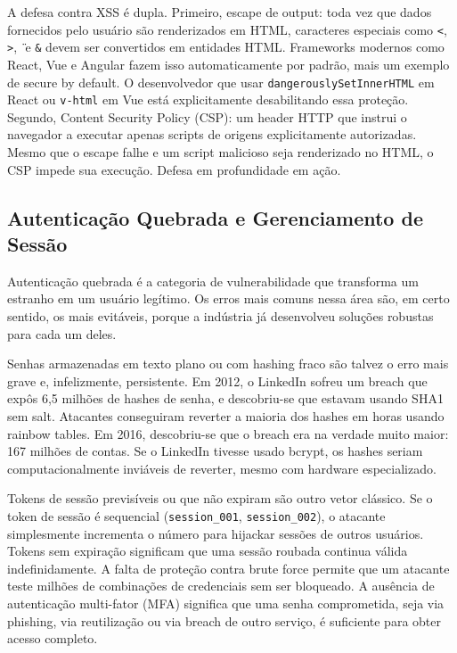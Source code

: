 A defesa contra XSS é dupla. Primeiro, escape de output: toda vez que dados
fornecidos pelo usuário são renderizados em HTML, caracteres especiais como
\texttt{<}, \texttt{>}, \texttt{\"} e \texttt{\&} devem ser convertidos em
entidades HTML. Frameworks modernos como React, Vue e Angular fazem isso
automaticamente por padrão, mais um exemplo de secure by default. O
desenvolvedor que usar \texttt{dangerouslySetInnerHTML} em React ou
\texttt{v-html} em Vue está explicitamente desabilitando essa proteção.
Segundo, Content Security Policy (CSP): um header HTTP que instrui o navegador a
executar apenas scripts de origens explicitamente autorizadas. Mesmo que o escape
falhe e um script malicioso seja renderizado no HTML, o CSP impede sua execução.
Defesa em profundidade em ação.

\subsection{Autenticação Quebrada e Gerenciamento de Sessão}

Autenticação quebrada é a categoria de vulnerabilidade que transforma um
estranho em um usuário legítimo. Os erros mais comuns nessa área são, em certo
sentido, os mais evitáveis, porque a indústria já desenvolveu soluções robustas
para cada um deles.

Senhas armazenadas em texto plano ou com hashing fraco são talvez o erro mais
grave e, infelizmente, persistente. Em 2012, o LinkedIn sofreu um breach que
expôs 6,5 milhões de hashes de senha, e descobriu-se que estavam usando SHA1
sem salt. Atacantes conseguiram reverter a maioria dos hashes em horas usando
rainbow tables. Em 2016, descobriu-se que o breach era na verdade muito maior:
167 milhões de contas. Se o LinkedIn tivesse usado bcrypt, os hashes seriam
computacionalmente inviáveis de reverter, mesmo com hardware especializado.

Tokens de sessão previsíveis ou que não expiram são outro vetor clássico. Se o
token de sessão é sequencial (\texttt{session\_001}, \texttt{session\_002}),
o atacante simplesmente incrementa o número para hijackar sessões de outros
usuários. Tokens sem expiração significam que uma sessão roubada continua
válida indefinidamente. A falta de proteção contra brute force permite que um
atacante teste milhões de combinações de credenciais sem ser bloqueado. A
ausência de autenticação multi-fator (MFA) significa que uma senha comprometida,
seja via phishing, via reutilização ou via breach de outro serviço, é suficiente
para obter acesso completo.

